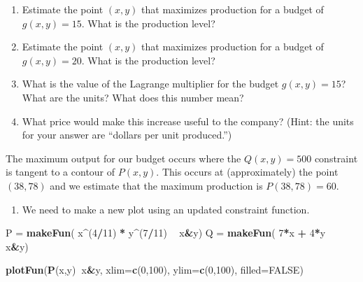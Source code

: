 \documentclass[
]{book}
\newenvironment{Shaded}{\begin{snugshade}}{\end{snugshade}}
\newcommand{\DataTypeTok}[1]{\textcolor[rgb]{0.13,0.29,0.53}{#1}}
\newcommand{\DecValTok}[1]{\textcolor[rgb]{0.00,0.00,0.81}{#1}}
\newcommand{\KeywordTok}[1]{\textcolor[rgb]{0.13,0.29,0.53}{\textbf{#1}}}
\newcommand{\NormalTok}[1]{#1}
\newcommand{\OperatorTok}[1]{\textcolor[rgb]{0.81,0.36,0.00}{\textbf{#1}}}
\newcommand{\OtherTok}[1]{\textcolor[rgb]{0.56,0.35,0.01}{#1}}
\newcommand{\StringTok}[1]{\textcolor[rgb]{0.31,0.60,0.02}{#1}}
\providecommand{\tightlist}{%
  \setlength{\itemsep}{0pt}\setlength{\parskip}{0pt}}
\begin{document}
\begin{enumerate}
\def\labelenumi{\arabic{enumi}.}
\tightlist
\item
  Estimate the point \((x,y)\) that maximizes production for a budget of \(g(x,y)=15\). What is the production level?
\item
  Estimate the point \((x,y)\) that maximizes production for a budget of \(g(x,y)=20\). What is the production level?
\item
  What is the value of the Lagrange multiplier for the budget \(g(x,y)=15\)? What are the units? What does this number mean?
\item
  What price would make this increase useful to the company? (Hint: the units for your answer are ``dollars per unit produced.'')
\end{enumerate}

The maximum output for our budget occurs where the \(Q(x,y)=500\) constraint is tangent to a contour of \(P(x,y)\). This occurs at (approximately) the point \((38,78)\) and we estimate that the maximum production is \(P(38,78)=60\).

\begin{enumerate}
\def\labelenumi{\arabic{enumi}.}
\setcounter{enumi}{1}
\tightlist
\item
  We need to make a new plot using an updated constraint function.
\end{enumerate}

\begin{Shaded}
\begin{Highlighting}[]
\NormalTok{P =}\StringTok{ }\KeywordTok{makeFun}\NormalTok{( x}\OperatorTok{^}\NormalTok{(}\DecValTok{4}\OperatorTok{/}\DecValTok{11}\NormalTok{) }\OperatorTok{*}\StringTok{ }\NormalTok{y}\OperatorTok{^}\NormalTok{(}\DecValTok{7}\OperatorTok{/}\DecValTok{11}\NormalTok{) }\OperatorTok{~}\StringTok{ }\NormalTok{x}\OperatorTok{&}\NormalTok{y)}
\NormalTok{Q =}\StringTok{ }\KeywordTok{makeFun}\NormalTok{( }\DecValTok{7}\OperatorTok{*}\NormalTok{x }\OperatorTok{+}\StringTok{ }\DecValTok{4}\OperatorTok{*}\NormalTok{y }\OperatorTok{~}\StringTok{ }\NormalTok{x}\OperatorTok{&}\NormalTok{y)}

\KeywordTok{plotFun}\NormalTok{(}\KeywordTok{P}\NormalTok{(x,y)}\OperatorTok{~}\NormalTok{x}\OperatorTok{&}\NormalTok{y, }\DataTypeTok{xlim=}\KeywordTok{c}\NormalTok{(}\DecValTok{0}\NormalTok{,}\DecValTok{100}\NormalTok{), }\DataTypeTok{ylim=}\KeywordTok{c}\NormalTok{(}\DecValTok{0}\NormalTok{,}\DecValTok{100}\NormalTok{), }\DataTypeTok{filled=}\OtherTok{FALSE}\NormalTok{)}
\end{Highlighting}
\end{Shaded}
\end{document}
